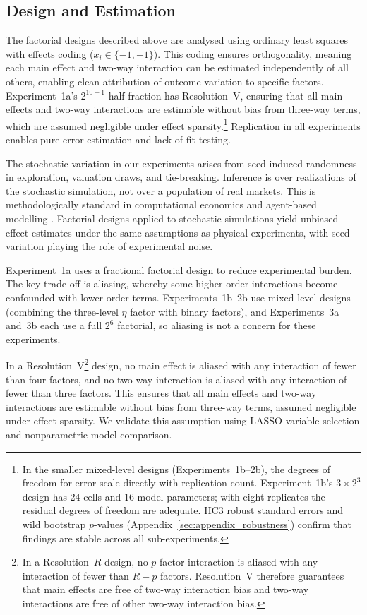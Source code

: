 \subsection{Design and Estimation}
\label{sec:appendix_inference}

The factorial designs described above are analysed using ordinary least squares with effects coding ($x_i \in \{-1, +1\}$). This coding ensures orthogonality, meaning each main effect and two-way interaction can be estimated independently of all others, enabling clean attribution of outcome variation to specific factors. Experiment~1a's $2^{10-1}$ half-fraction has Resolution~V, ensuring that all main effects and two-way interactions are estimable without bias from three-way terms, which are assumed negligible under effect sparsity.\footnote{In the smaller mixed-level designs (Experiments~1b--2b), the degrees of freedom for error scale directly with replication count. Experiment~1b's $3 \times 2^3$ design has 24 cells and 16 model parameters; with eight replicates the residual degrees of freedom are adequate. HC3 robust standard errors and wild bootstrap $p$-values (Appendix~\ref{sec:appendix_robustness}) confirm that findings are stable across all sub-experiments.} Replication in all experiments enables pure error estimation and lack-of-fit testing.

The stochastic variation in our experiments arises from seed-induced randomness in exploration, valuation draws, and tie-breaking. Inference is over realizations of the stochastic simulation, not over a population of real markets. This is methodologically standard in computational economics and agent-based modelling \citep{Tesfatsion2006}. Factorial designs applied to stochastic simulations yield unbiased effect estimates under the same assumptions as physical experiments, with seed variation playing the role of experimental noise.

Experiment~1a uses a fractional factorial design to reduce experimental burden. The key trade-off is aliasing, whereby some higher-order interactions become confounded with lower-order terms. Experiments~1b--2b use mixed-level designs (combining the three-level $\eta$ factor with binary factors), and Experiments~3a and~3b each use a full $2^6$ factorial, so aliasing is not a concern for these experiments.

In a Resolution~V\footnote{In a Resolution~$R$ design, no $p$-factor interaction is aliased with any interaction of fewer than $R - p$ factors. Resolution~V therefore guarantees that main effects are free of two-way interaction bias and two-way interactions are free of other two-way interaction bias.} design, no main effect is aliased with any interaction of fewer than four factors, and no two-way interaction is aliased with any interaction of fewer than three factors. This ensures that all main effects and two-way interactions are estimable without bias from three-way terms, assumed negligible under effect sparsity. We validate this assumption using LASSO variable selection and nonparametric model comparison.


